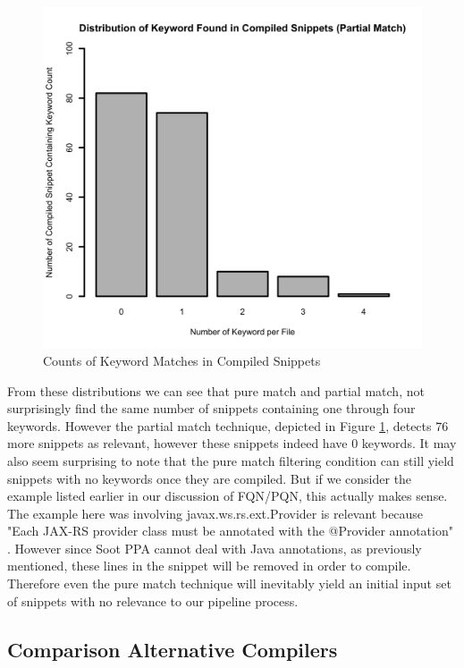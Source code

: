 \documentclass[10pt, conference]{IEEEtran}
\begin{document}
\begin{figure}[h]
\begin{center}
\includegraphics[width=0.9\linewidth]{CompiledKeywordDistPartialMatch.png}
\caption{Counts of Keyword Matches in Compiled Snippets \label{fig:KeywordDistPartialMatch}}
\end{center}
\end{figure}

From these distributions we can see that pure match and partial match, not surprisingly find the same number of snippets containing one through four keywords. However the partial match technique, depicted in Figure \ref{fig:KeywordDistPartialMatch}, detects 76 more snippets as relevant, however these snippets indeed have 0 keywords. It may also seem surprising to note that the pure match filtering condition can still yield snippets with no keywords once they are compiled. But if we consider the example listed earlier in our discussion of FQN/PQN, this actually makes sense. The example here was involving javax.ws.rs.ext.Provider is relevant because "Each JAX-RS provider class must be annotated with the @Provider annotation" \cite{jax.Provider}. However since Soot PPA cannot deal with Java annotations, as previously mentioned, these lines in the snippet will be removed in order to compile. Therefore even the pure match technique will inevitably yield an initial input set of snippets with no relevance to our pipeline process.

\subsection{Comparison Alternative Compilers}
\end{document}
